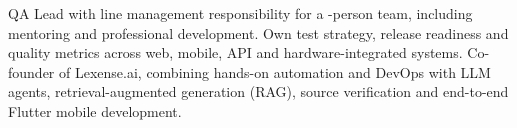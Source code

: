 QA Lead with line management responsibility for a \qaTeamSize-person team,
including mentoring and professional development. Own test strategy, release
readiness and quality metrics across web, mobile, API and hardware-integrated
systems. Co-founder of Lexense.ai, combining hands-on automation and DevOps with
LLM agents, retrieval-augmented generation (RAG), source verification and
end-to-end Flutter mobile development.
